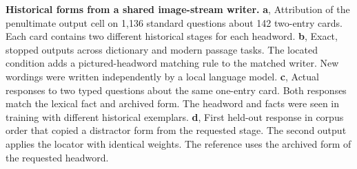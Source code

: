 \textbf{Historical forms from a shared image-stream writer.}
\textbf{a}, Attribution of the penultimate output cell on 1,136 standard questions about 142 two-entry cards. Each card contains two different historical stages for each headword. \textbf{b}, Exact, stopped outputs across dictionary and modern passage tasks. The located condition adds a pictured-headword matching rule to the matched writer. New wordings were written independently by a local language model. \textbf{c}, Actual responses to two typed questions about the same one-entry card. Both responses match the lexical fact and archived form. The headword and facts were seen in training with different historical exemplars. \textbf{d}, First held-out response in corpus order that copied a distractor form from the requested stage. The second output applies the locator with identical weights. The reference uses the archived form of the requested headword.
